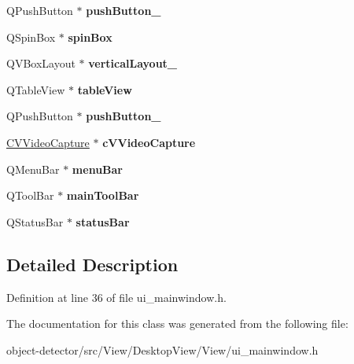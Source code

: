 \begin{DoxyCompactItemize}
\mbox{\label{class_ui___main_window_adafdad7c065227c5d14b68d75789cbe2}} 
Q\+Push\+Button $\ast$ {\bfseries push\+Button\+\_}
\item 
\mbox{\label{class_ui___main_window_a5ee2488c049a177071c1485b4138e113}} 
Q\+Spin\+Box $\ast$ {\bfseries spin\+Box}
\item 
\mbox{\label{class_ui___main_window_a38b8a4b887f3b58e2a49e7905ae6f1f0}} 
Q\+V\+Box\+Layout $\ast$ {\bfseries vertical\+Layout\+\_}
\item 
\mbox{\label{class_ui___main_window_a3f4332a5b5e82f676f25ec3148c1c83c}} 
Q\+Table\+View $\ast$ {\bfseries table\+View}
\item 
\mbox{\label{class_ui___main_window_acb0b2f196dc2224f287b67594233297f}} 
Q\+Push\+Button $\ast$ {\bfseries push\+Button\+\_}
\item 
\mbox{\label{class_ui___main_window_a202ae5e4de2494091a0640f9e7a5bcd0}} 
\hyperlink{class_c_v_video_capture}{C\+V\+Video\+Capture} $\ast$ {\bfseries c\+V\+Video\+Capture}
\item 
\mbox{\label{class_ui___main_window_a2be1c24ec9adfca18e1dcc951931457f}} 
Q\+Menu\+Bar $\ast$ {\bfseries menu\+Bar}
\item 
\mbox{\label{class_ui___main_window_a5172877001c8c7b4e0f6de50421867d1}} 
Q\+Tool\+Bar $\ast$ {\bfseries main\+Tool\+Bar}
\item 
\mbox{\label{class_ui___main_window_a50fa481337604bcc8bf68de18ab16ecd}} 
Q\+Status\+Bar $\ast$ {\bfseries status\+Bar}
\end{DoxyCompactItemize}


\subsection{Detailed Description}


Definition at line 36 of file ui\+\_\+mainwindow.\+h.



The documentation for this class was generated from the following file\+:\begin{DoxyCompactItemize}
\item 
object-\/detector/src/\+View/\+Desktop\+View/\+View/ui\+\_\+mainwindow.\+h\end{DoxyCompactItemize}
